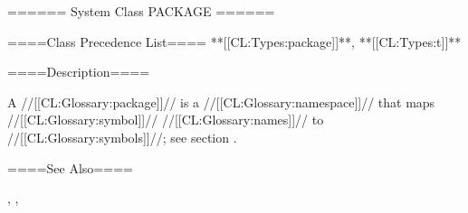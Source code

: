 ====== System Class PACKAGE ======

====Class Precedence List==== **[[CL:Types:package]]**, **[[CL:Types:t]]**

====Description====

A //[[CL:Glossary:package]]// is a //[[CL:Glossary:namespace]]// that maps //[[CL:Glossary:symbol]]// //[[CL:Glossary:names]]// to //[[CL:Glossary:symbols]]//; see section {\secref\PackageConcepts}.

====See Also====

{\secref\PackageConcepts}, {\secref\PrintingOtherObjects}, {\secref\SymbolTokens}

